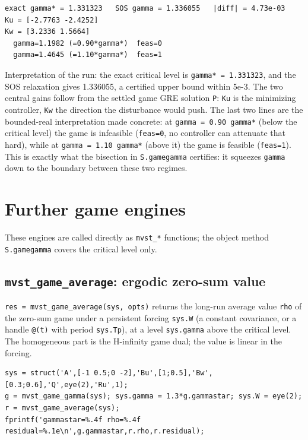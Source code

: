 \documentclass[11pt,oneside]{report}
\newcommand{\code}[1]{\texttt{#1}}
\begin{document}
\begin{lstlisting}[style=outputstyle]
exact gamma* = 1.331323   SOS gamma = 1.336055   |diff| = 4.73e-03
Ku = [-2.7763 -2.4252]
Kw = [3.2336 1.5664]
  gamma=1.1982 (=0.90*gamma*)  feas=0
  gamma=1.4645 (=1.10*gamma*)  feas=1
\end{lstlisting}

Interpretation of the run: the exact critical level is \code{gamma* = 1.331323}, and the SOS
relaxation gives 1.336055, a certified upper bound within 5e-3. The two central
gains follow from the settled game GRE solution \code{P}: \code{Ku} is the minimizing
controller, \code{Kw} the direction the disturbance would push. The last two lines
are the bounded-real interpretation made concrete: at \code{gamma = 0.90 gamma*} (below the
critical level) the game is infeasible (\code{feas=0}, no controller can attenuate
that hard), while at \code{gamma = 1.10 gamma*} (above it) the game is feasible
(\code{feas=1}). This is exactly what the bisection in \code{S.gamegamma} certifies: it
squeezes \code{gamma} down to the boundary between these two regimes.

\hypertarget{further-game-engines}{%
\section{Further game engines}\label{further-game-engines}}

These engines are called directly as \code{mvst\_*} functions; the object method
\code{S.gamegamma} covers the critical level only.

\hypertarget{mvst_game_average-ergodic-zero-sum-value}{%
\subsection{\texorpdfstring{\code{mvst\_game\_average}: ergodic zero-sum value}{mvst\_game\_average: ergodic zero-sum value}}\label{mvst_game_average-ergodic-zero-sum-value}}

\code{res = mvst\_game\_average(sys, opts)} returns the long-run average value \code{rho} of
the zero-sum game under a persistent forcing \code{sys.W} (a constant covariance, or
a handle \code{@(t)} with period \code{sys.Tp}), at a level \code{sys.gamma} above the critical
level. The homogeneous part is the H-infinity game dual; the value is linear in
the forcing.

\begin{lstlisting}[style=matlabstyle]
sys = struct('A',[-1 0.5;0 -2],'Bu',[1;0.5],'Bw',[0.3;0.6],'Q',eye(2),'Ru',1);
g = mvst_game_gamma(sys); sys.gamma = 1.3*g.gammastar; sys.W = eye(2);
r = mvst_game_average(sys);
fprintf('gammastar=%.4f rho=%.4f residual=%.1e\n',g.gammastar,r.rho,r.residual);
\end{lstlisting}
\end{document}
